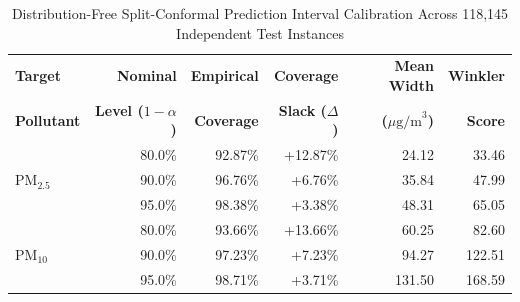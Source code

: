\begin{table}[t]
\caption{Distribution-Free Split-Conformal Prediction Interval Calibration Across 118,145 Independent Test Instances}
\label{tab:conformal_calibration}
\centering
\small
\begin{tabular}{lrrrrr}
\toprule
\textbf{Target} & \textbf{Nominal} & \textbf{Empirical} & \textbf{Coverage} & \textbf{Mean Width} & \textbf{Winkler} \\
\textbf{Pollutant} & \textbf{Level ($1-\alpha$)} & \textbf{Coverage} & \textbf{Slack ($\Delta$)} & \textbf{($\mu\text{g/m}^3$)} & \textbf{Score} \\
\midrule
\multirow{3}{*}{$\text{PM}_{2.5}$} 
& 80.0\% & 92.87\% & +12.87\% & 24.12 & 33.46 \\
& 90.0\% & 96.76\% & +6.76\% & 35.84 & 47.99 \\
& 95.0\% & 98.38\% & +3.38\% & 48.31 & 65.05 \\
\midrule
\multirow{3}{*}{$\text{PM}_{10}$} 
& 80.0\% & 93.66\% & +13.66\% & 60.25 & 82.60 \\
& 90.0\% & 97.23\% & +7.23\% & 94.27 & 122.51 \\
& 95.0\% & 98.71\% & +3.71\% & 131.50 & 168.59 \\
\bottomrule
\end{tabular}
\end{table}
